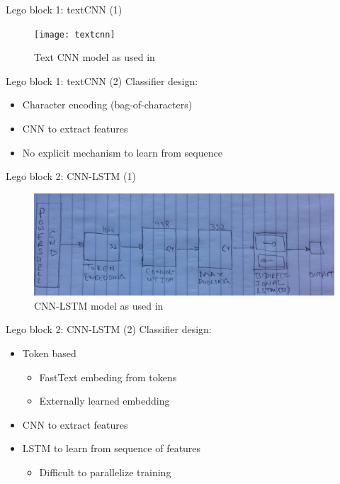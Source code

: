 \documentclass[10pt]{beamer}
\begin{document}
\begin{frame}{Lego block 1: textCNN (1)}
	\begin{figure}
		\texttt{[image: textcnn]}
		\caption{Text CNN model as used in \cite{powershell2018}}
	\end{figure}
\end{frame}

\begin{frame}{Lego block 1: textCNN (2)}
	Classifier design:
	\begin{itemize}
		\item Character encoding (bag-of-characters)
		\item CNN to extract features
		\item No explicit mechanism to learn from sequence
	\end{itemize}
\end{frame}

\begin{frame}{Lego block 2: CNN-LSTM (1)}
	\begin{figure}
		\includegraphics[scale=0.50]{cnn-lstm}
		\caption{CNN-LSTM model as used in \cite{amsi2019}}
	\end{figure}
\end{frame}

\begin{frame}{Lego block 2: CNN-LSTM (2)}
	Classifier design:
	\begin{itemize}
		\item Token based
		\begin{itemize}
			\item FastText embeding from tokens
			\item Externally learned embedding
		\end{itemize}
		\item CNN to extract features
		\item LSTM to learn from sequence of features
		\begin{itemize}
			\item Difficult to parallelize training
		\end{itemize}
	\end{itemize}
\end{frame}
\end{document}
